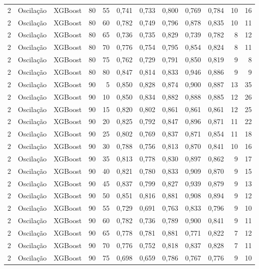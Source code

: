\begin{longtable}{ccclrrrrrrrr}
2 & Oscilação & XGBoost & 80 & 55 & 0,741 & 0,733 & 0,800 & 0,769 & 0,784 & 10 & 16 \\
2 & Oscilação & XGBoost & 80 & 60 & 0,782 & 0,749 & 0,796 & 0,878 & 0,835 & 10 & 11 \\
2 & Oscilação & XGBoost & 80 & 65 & 0,736 & 0,735 & 0,829 & 0,739 & 0,782 & 8 & 12 \\
2 & Oscilação & XGBoost & 80 & 70 & 0,776 & 0,754 & 0,795 & 0,854 & 0,824 & 8 & 11 \\
2 & Oscilação & XGBoost & 80 & 75 & 0,762 & 0,729 & 0,791 & 0,850 & 0,819 & 9 & 8 \\
2 & Oscilação & XGBoost & 80 & 80 & 0,847 & 0,814 & 0,833 & 0,946 & 0,886 & 9 & 9 \\
2 & Oscilação & XGBoost & 90 & 5 & 0,850 & 0,828 & 0,874 & 0,900 & 0,887 & 13 & 35 \\
2 & Oscilação & XGBoost & 90 & 10 & 0,850 & 0,834 & 0,882 & 0,888 & 0,885 & 12 & 26 \\
2 & Oscilação & XGBoost & 90 & 15 & 0,820 & 0,802 & 0,861 & 0,861 & 0,861 & 12 & 25 \\
2 & Oscilação & XGBoost & 90 & 20 & 0,825 & 0,792 & 0,847 & 0,896 & 0,871 & 11 & 22 \\
2 & Oscilação & XGBoost & 90 & 25 & 0,802 & 0,769 & 0,837 & 0,871 & 0,854 & 11 & 18 \\
2 & Oscilação & XGBoost & 90 & 30 & 0,788 & 0,756 & 0,813 & 0,870 & 0,841 & 10 & 16 \\
2 & Oscilação & XGBoost & 90 & 35 & 0,813 & 0,778 & 0,830 & 0,897 & 0,862 & 9 & 17 \\
2 & Oscilação & XGBoost & 90 & 40 & 0,821 & 0,780 & 0,833 & 0,909 & 0,870 & 9 & 15 \\
2 & Oscilação & XGBoost & 90 & 45 & 0,837 & 0,799 & 0,827 & 0,939 & 0,879 & 9 & 13 \\
2 & Oscilação & XGBoost & 90 & 50 & 0,851 & 0,816 & 0,881 & 0,908 & 0,894 & 9 & 12 \\
2 & Oscilação & XGBoost & 90 & 55 & 0,729 & 0,691 & 0,763 & 0,833 & 0,796 & 9 & 10 \\
2 & Oscilação & XGBoost & 90 & 60 & 0,782 & 0,736 & 0,789 & 0,900 & 0,841 & 9 & 11 \\
2 & Oscilação & XGBoost & 90 & 65 & 0,778 & 0,781 & 0,881 & 0,771 & 0,822 & 7 & 12 \\
2 & Oscilação & XGBoost & 90 & 70 & 0,776 & 0,752 & 0,818 & 0,837 & 0,828 & 7 & 11 \\
2 & Oscilação & XGBoost & 90 & 75 & 0,698 & 0,659 & 0,786 & 0,767 & 0,776 & 9 & 10 \\

\end{longtable}
